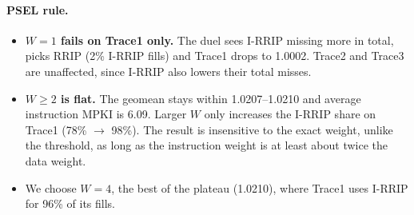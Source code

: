 \documentclass[11pt,a4paper]{article}
\begin{document}

\paragraph{PSEL rule.}
\begin{itemize}
    \item \textbf{$W=1$ fails on Trace1 only.} The duel sees I-RRIP missing more in total, picks RRIP (2\% I-RRIP fills) and Trace1
          drops to 1.0002. Trace2 and Trace3 are unaffected, since I-RRIP also lowers their total misses.
    \item \textbf{$W \ge 2$ is flat.} The geomean stays within 1.0207--1.0210 and average instruction MPKI is 6.09.
          Larger $W$ only increases the I-RRIP share on Trace1 (78\% $\to$ 98\%). The result is insensitive to the exact weight,
          unlike the threshold, as long as the instruction weight is at least about twice the data weight.
    \item We choose $W=4$, the best of the plateau (1.0210), where Trace1 uses I-RRIP for 96\% of its fills.
\end{itemize}
\end{document}
